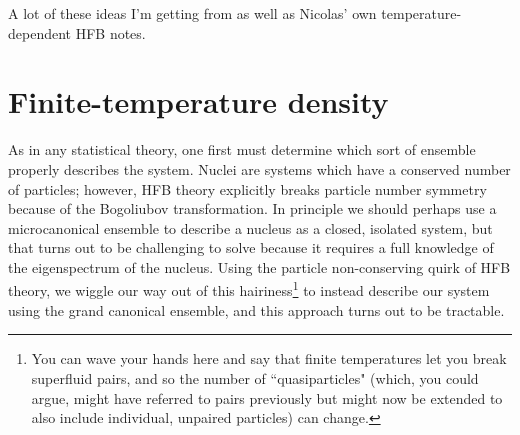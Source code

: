 %
%


A lot of these ideas I'm getting from \cite{Schunck2015b} as well as Nicolas' own temperature-dependent HFB notes.

\section{Finite-temperature density}

As in any statistical theory, one first must determine which sort of ensemble properly describes the system. Nuclei are systems which have a conserved number of particles; however, HFB theory explicitly breaks particle number symmetry because of the Bogoliubov transformation. In principle we should perhaps use a microcanonical ensemble to describe a nucleus as a closed, isolated system, but that turns out to be challenging to solve because it requires a full knowledge of the eigenspectrum of the nucleus. Using the particle non-conserving quirk of HFB theory, we wiggle our way out of this hairiness\footnote{You can wave your hands here and say that finite temperatures let you break superfluid pairs, and so the number of ``quasiparticles" (which, you could argue, might have referred to pairs previously but might now be extended to also include individual, unpaired particles) can change.} to instead describe our system using the grand canonical ensemble, and this approach turns out to be tractable.

